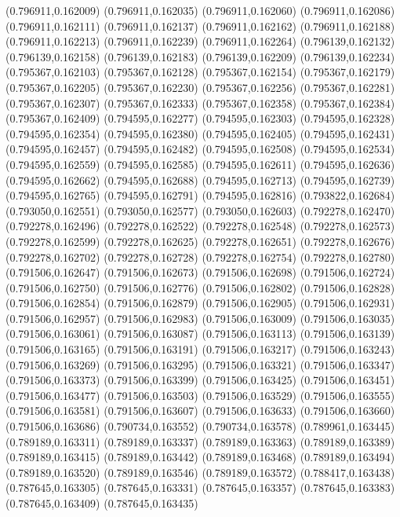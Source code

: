 (0.796911,0.162009)
(0.796911,0.162035)
(0.796911,0.162060)
(0.796911,0.162086)
(0.796911,0.162111)
(0.796911,0.162137)
(0.796911,0.162162)
(0.796911,0.162188)
(0.796911,0.162213)
(0.796911,0.162239)
(0.796911,0.162264)
(0.796139,0.162132)
(0.796139,0.162158)
(0.796139,0.162183)
(0.796139,0.162209)
(0.796139,0.162234)
(0.795367,0.162103)
(0.795367,0.162128)
(0.795367,0.162154)
(0.795367,0.162179)
(0.795367,0.162205)
(0.795367,0.162230)
(0.795367,0.162256)
(0.795367,0.162281)
(0.795367,0.162307)
(0.795367,0.162333)
(0.795367,0.162358)
(0.795367,0.162384)
(0.795367,0.162409)
(0.794595,0.162277)
(0.794595,0.162303)
(0.794595,0.162328)
(0.794595,0.162354)
(0.794595,0.162380)
(0.794595,0.162405)
(0.794595,0.162431)
(0.794595,0.162457)
(0.794595,0.162482)
(0.794595,0.162508)
(0.794595,0.162534)
(0.794595,0.162559)
(0.794595,0.162585)
(0.794595,0.162611)
(0.794595,0.162636)
(0.794595,0.162662)
(0.794595,0.162688)
(0.794595,0.162713)
(0.794595,0.162739)
(0.794595,0.162765)
(0.794595,0.162791)
(0.794595,0.162816)
(0.793822,0.162684)
(0.793050,0.162551)
(0.793050,0.162577)
(0.793050,0.162603)
(0.792278,0.162470)
(0.792278,0.162496)
(0.792278,0.162522)
(0.792278,0.162548)
(0.792278,0.162573)
(0.792278,0.162599)
(0.792278,0.162625)
(0.792278,0.162651)
(0.792278,0.162676)
(0.792278,0.162702)
(0.792278,0.162728)
(0.792278,0.162754)
(0.792278,0.162780)
(0.791506,0.162647)
(0.791506,0.162673)
(0.791506,0.162698)
(0.791506,0.162724)
(0.791506,0.162750)
(0.791506,0.162776)
(0.791506,0.162802)
(0.791506,0.162828)
(0.791506,0.162854)
(0.791506,0.162879)
(0.791506,0.162905)
(0.791506,0.162931)
(0.791506,0.162957)
(0.791506,0.162983)
(0.791506,0.163009)
(0.791506,0.163035)
(0.791506,0.163061)
(0.791506,0.163087)
(0.791506,0.163113)
(0.791506,0.163139)
(0.791506,0.163165)
(0.791506,0.163191)
(0.791506,0.163217)
(0.791506,0.163243)
(0.791506,0.163269)
(0.791506,0.163295)
(0.791506,0.163321)
(0.791506,0.163347)
(0.791506,0.163373)
(0.791506,0.163399)
(0.791506,0.163425)
(0.791506,0.163451)
(0.791506,0.163477)
(0.791506,0.163503)
(0.791506,0.163529)
(0.791506,0.163555)
(0.791506,0.163581)
(0.791506,0.163607)
(0.791506,0.163633)
(0.791506,0.163660)
(0.791506,0.163686)
(0.790734,0.163552)
(0.790734,0.163578)
(0.789961,0.163445)
(0.789189,0.163311)
(0.789189,0.163337)
(0.789189,0.163363)
(0.789189,0.163389)
(0.789189,0.163415)
(0.789189,0.163442)
(0.789189,0.163468)
(0.789189,0.163494)
(0.789189,0.163520)
(0.789189,0.163546)
(0.789189,0.163572)
(0.788417,0.163438)
(0.787645,0.163305)
(0.787645,0.163331)
(0.787645,0.163357)
(0.787645,0.163383)
(0.787645,0.163409)
(0.787645,0.163435)
